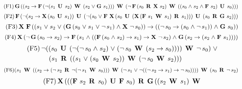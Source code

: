 \begin{table}[h]
\begin{footnotesize}

\begin{equation}\tag{F1}
\G ((s_2 \mathrel{\rightarrow} \F (\mathop{\neg}(s_1 \U  s_2) \W  (s_2 \mathrel{\vee} \G s_1))) \W  (\mathop{\neg}\F (s_0 \R  \X s_2) \W  ((s_0 \mathrel{\wedge} s_2 \mathrel{\wedge} \F s_2) \U  s_0)))
\end{equation}
%
\squeeze
%
\begin{equation}\tag{F2}
\F (\mathop{\neg}(s_2 \mathrel{\rightarrow} \X (s_0 \U  s_1)) \U  (\mathop{\neg}(s_0 \mathrel{\vee} \F \X (s_0 \U  (\X (\F s_1 \W  s_1) \R  s_1))) 
\U  (s_0 \R  \G s_2)))
\end{equation}
%
\squeeze
%
\begin{equation}\tag{F3}
\X \F ((s_1 \mathrel{\vee} s_2 \mathrel{\vee} (\G (s_0 \mathrel{\vee} s_1 \mathrel{\vee} \mathop{\neg}s_1) \mathrel{\wedge} \X \mathop{\neg}s_0)) \mathrel{\rightarrow} \\
((\mathop{\neg}s_0 \mathrel{\rightarrow} (s_0 \mathrel{\wedge} \mathop{\neg}s_1)) \mathrel{\wedge} \G s_0))
\end{equation}
%
\squeeze
%
\begin{equation}\tag{F4}
\X (\mathop{\neg}\G (s_0 \mathrel{\rightarrow} s_2) \mathrel{\rightarrow} \F (s_1 \mathrel{\wedge} ((\F (s_0 \mathrel{\wedge} s_2) \mathrel{\rightarrow} s_1) \mathrel{\rightarrow} \X \mathop{\neg}s_2) \mathrel{\wedge} \G (s_2 \mathrel{\rightarrow} (s_2 \mathrel{\wedge} \F s_1))))
\end{equation}
%
\squeezemore
%
\begin{multline}\tag{F5}
\mathop{\neg}((s_0 \U  (\mathop{\neg}(\mathop{\neg}s_0 \mathrel{\wedge} s_2) \mathrel{\vee} (\mathop{\neg}s_0 \W  (s_2 \mathrel{\rightarrow} s_0)))) \W  \mathop{\neg}s_0) \mathrel{\vee} \\
(s_1 \R  ((s_1 \mathrel{\vee} (s_0 \W  s_2)) \W  (\mathop{\neg}s_0 \W  s_2)))
\end{multline}
%
\squeezemore
%
\begin{equation}\tag{F6}
(s_1 \W  ((s_2 \mathrel{\rightarrow} (\mathop{\neg}s_2 \R  \mathop{\neg}(\mathop{\neg}s_1 \W  s_0))) \W  (\mathop{\neg}s_1 \mathrel{\vee} \mathop{\neg}((\mathop{\neg}s_2 \mathrel{\rightarrow} s_1) \mathrel{\rightarrow} \mathop{\neg}s_0)))) \W  (s_0 \R  \mathop{\neg}s_2)
\end{equation}
%
\squeezemore
%
\begin{multline}\tag{F7}
\X (((\F s_2 \R  s_0) \U  \F s_0) \R  \G ((s_2 \W  s_1) \W  \\

\end{multline}
\end{footnotesize}
\end{table}
